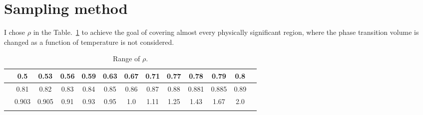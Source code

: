 \documentclass[aps,pra]{revtex4}   	%
\begin{document}
\section{Sampling method}

I chose $\rho$ in the Table.~\ref{Table1} to achieve the goal of covering almost every physically significant region, where the phase transition volume is changed as a function of temperature is not considered. 
\begin{table}
\begin{tabular}{cc|c|c|c|c|c|c|c|c|c|cc}
\Xhline{2\arrayrulewidth}
& 0.5 & 0.53 & 0.56 & 0.59 & 0.63 & 0.67 & 0.71 & 0.77 & 0.78 & 0.79 & 0.8 & \\
\hline 
& 0.81 & 0.82 & 0.83 & 0.84 & 0.85 & 0.86 & 0.87 & 0.88 & 0.881 & 0.885 & 0.89 & \\
\hline 
& 0.903 & 0.905 & 0.91 & 0.93 & 0.95 & 1.0 & 1.11 & 1.25 & 1.43 & 1.67 & 2.0 & \\
\Xhline{2\arrayrulewidth}\end{tabular}
\caption{Range of $\rho$. }\label{Table1}
\end{table}






\end{document}
